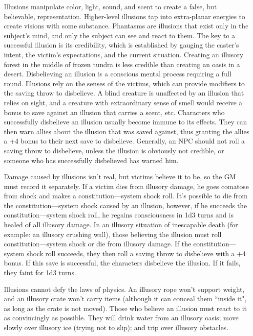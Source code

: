 \begin{multicols}{2}
Illusions manipulate color, light, sound, and scent to create a false, but believable, representation.  Higher-level illusions tap into extra-planar energies to create visions with some substance.  Phantasms are illusions that exist only in the subject's mind, and only the subject can see and react to them.  The key to a successful illusion is its credibility, which is established by gauging the caster's intent, the victim's expectations, and the current situation.  Creating an illusory forest in the middle of frozen tundra is less credible than creating an oasis in a desert.  Disbelieving an illusion is a conscious mental process requiring a full round.  Illusions rely on the senses of the victims, which can provide modifiers to the saving throw to disbelieve.  A blind creature is unaffected by an illusion that relies on sight, and a creature with extraordinary sense of smell would receive a bonus to save against an illusion that carries a scent, etc.  Characters who successfully disbelieve an illusion usually become immune to its effects.  They can then warn allies about the illusion that was saved against, thus granting the allies a +4 bonus to their next save to disbelieve.  Generally, an NPC should not roll a saving throw to disbelieve, unless the illusion is obviously not credible, or someone who has successfully disbelieved has warned him.  
 
Damage caused by illusions isn't real, but victims believe it to be, so the GM must record it separately.  If a victim dies from illusory damage, he goes comatose from shock and makes a constitution---system shock roll.  It's possible to die from the constitution---system shock caused by an illusion, however, if he succeeds the constitution---system shock roll, he regains consciousness in 1d3 turns and is healed of all illusory damage.  In an illusory situation of inescapable death (for example: an illusory crushing wall), those believing the illusion must roll constitution---system shock or die from illusory damage.  If the constitution---system shock roll succeeds, they then roll a saving throw to disbelieve with a  +4 bonus.  If this save is successful, the characters disbelieve the illusion.  If it fails, they faint for 1d3 turns.

Illusions cannot defy the laws of physics.  An illusory rope won't support weight, and an illusory crate won't carry items (although it can conceal them ``inside it", as long as the crate is not moved).  Those who believe an illusion must react to it as convincingly as possible.  They will drink water from an illusory oasis; move slowly over illusory ice (trying not to slip); and trip over illusory obstacles.  


\end{multicols}
